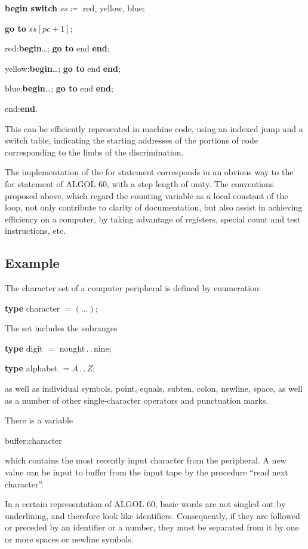 \documentclass[twoside,11pt]{book}
\begin{document}
\quad \textbf{begin switch} $ss \coloneq$ red, yellow, blue;

\quad \quad \textbf{go to} $ss[pc + 1]$;

\quad \quad red:\textbf{begin}\dots; \textbf{go to} end \textbf{end};

\quad \quad yellow:\textbf{begin}\dots; \textbf{go to} end \textbf{end};

\quad \quad blue:\textbf{begin}\dots; \textbf{go to} end \textbf{end};

\quad end:\textbf{end}. 

This can be efficiently represented in machine code, using an indexed jump and a switch table, indicating the starting addresses of the portions of code corresponding to the limbs of the discrimination.

The implementation of the for statement corresponds in an obvious way to the for statement of ALGOL 60, with a step length of unity. The conventions proposed above, which regard the counting variable as a local constant of the loop, not only contribute to clarity of documentation, but also assist in achieving efficiency on a computer, by taking advantage of registers, special count and test instructions, etc.

\subsection{Example}
\label{sec:example-3-3}

The character set of a computer peripheral is defined by enumeration:

\quad \textbf{type} character $= (\dots)$;

\noindent
The set includes the subranges

\quad \textbf{type} digit $=$ nought\,.\,.\,nine;

\quad \textbf{type} alphabet $= A\,.\,.\,Z$;

\noindent
as well as individual symbols, point, equals, subten, colon, newline, space, as well as a number of other single-character operators and punctuation marks.

There is a variable

\quad buffer:character 

\noindent
which contains the most recently input character from the peripheral. A new value can be input to buffer from the input tape by the procedure ``read next character''.

In a certain representation of ALGOL 60, basic words are not singled out by underlining, and therefore look like identifiers. Consequently, if they are followed or preceded by an identifier or a number, they must be separated from it by one or more spaces or newline symbols.
\end{document}
